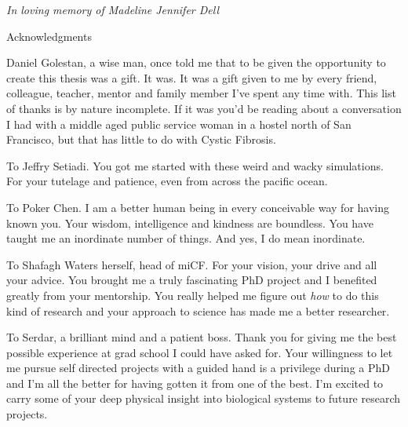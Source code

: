 \newpage


\thispagestyle{empty}


\begin{center}
	\vspace*{\fill}
\textit {In loving memory of Madeline Jennifer Dell} \\
	\vspace*{\fill}
\end{center}

\clearpage

\begin{center}
\begin{Large}
\begin{bfseries}
Acknowledgments
\end{bfseries}
\end{Large}
\end{center}
 Daniel Golestan, a wise man, once told me that to be given the opportunity to create this thesis was a gift. It was. It was a gift given to me by every friend, colleague, teacher, mentor and family member I've spent any time with. This list of thanks is by nature incomplete. If it was you'd be reading about a conversation I had with a middle aged public service woman in a hostel north of San Francisco, but that has little to do with Cystic Fibrosis. 

To Jeffry Setiadi. You got me started with these weird and wacky simulations. For your tutelage and patience, even from across the pacific ocean.

To Poker Chen. I am a better human being in every conceivable way for having known you. Your wisdom, intelligence and kindness are boundless. You have taught me an inordinate number of things. And yes, I do mean inordinate. 


To Shafagh Waters herself, head of miCF. For your vision, your drive and all your advice. You brought me a truly fascinating PhD project and I benefited greatly from your mentorship. You really helped me figure out \textit{how} to do this kind of research and your approach to science has made me a better researcher.

To Serdar, a brilliant mind and a patient boss. Thank you for giving me the best possible experience at grad school I could have asked for. Your willingness to let me pursue self directed projects with a guided hand is a privilege during a PhD and I'm all the better for having gotten it from one of the best. I'm excited to carry some of your deep physical insight into biological systems to future research projects. 

